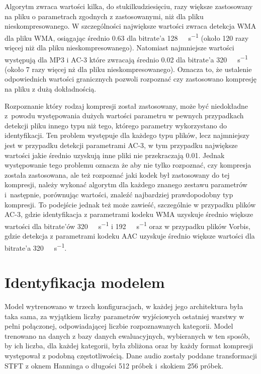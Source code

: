 \documentclass[pl,12pt]{aghdpl}
\let\Oldsection\section%
\renewcommand{\section}{\FloatBarrier\Oldsection}
\begin{document}
Algorytm zwraca wartości kilka, do stukilkudziesięciu, razy większe zastosowany na pliku o
parametrach zgodnych z zastosowanymi, niż dla pliku nieskompresowanego. W
szczególności największe wartości zwraca detekcja WMA dla pliku WMA, osiągając
średnio \num{0.63} dla bitrate'a \SI{128}{\kibi\bit\per\second} (około 120
razy więcej niż dla pliku nieskompresowanego). Natomiast
najmniejsze wartości występują dla MP3 i AC-3 które zwracają średnio \num{0.02}
dla bitrate'a \SI{320}{\kibi\bit\per\second} (około 7 razy więcej nż dla pliku
nieskompresowanego). Oznacza to, że ustalenie odpowiednich wartości granicznych
pozwoli rozpoznać czy zastosowano kompresję na pliku z dużą dokładnością.

Rozpoznanie który rodzaj kompresji został zastosowany, może być niedokładne z~powodu występowania
dużych wartości parametru w pewnych przypadkach detekcji pliku innego typu niż
tego, którego parametry wykorzystano do identyfikacji. Ten problem występuje dla
każdego typu plików, lecz najmniejszy jest w przypadku detekcji parametrami
AC-3, w tym przypadku największe wartości jakie średnio uzyskują inne pliki nie
przekraczają \num{0.01}. Jednak występowanie tego problemu oznacza że aby nie
tylko rozpoznać, czy kompresja została zastosowana, ale też rozpoznać jaki kodek
był zastosowany do tej kompresji, należy wykonać algorytm dla każdego znanego
zestawu parametrów i~następnie, porównując wartości, znaleźć najbardziej
prawdopodobny typ kompresji. To podejście jednak też może zawieść, szczególnie
w przypadku plików AC-3, gdzie identyfikacja z parametrami kodeku WMA uzyskuje
średnio większe wartości dla bitrate'ów \SI{320}{\kibi\bit\per\second} i
\SI{192}{\kibi\bit\per\second} oraz w przypadku plików Vorbis, gdzie detekcja z
parametrami kodeku AAC uzyskuje średnio większe wartości dla bitrate'a
\SI{320}{\kibi\bit\per\second}.
\section{Identyfikacja modelem}
Model wytrenowano w trzech konfiguracjach, w każdej jego architektura była taka
sama, za wyjątkiem liczby parametrów wyjściowych ostatniej warstwy w pełni
połączonej, odpowiadającej liczbie rozpoznawanych kategorii. Model trenowano na
danych z bazy danych ewaluacyjnych, wybieranych w ten sposób, by ich liczba,
dla każdej kategorii, była zbliżona oraz by każdy format kompresji występował z
podobną częstotliwością. Dane audio zostały poddane transformacji STFT z oknem
Hanninga o długości 512 próbek i~skokiem 256 próbek.
\end{document}
